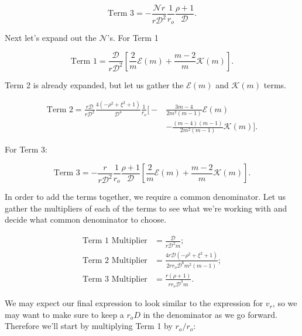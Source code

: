 \begin{equation}
        \text{Term 3} = -\frac{\mathcal{N}r}{r\mathcal{D}^2}\frac{1}{r_o}\frac{\rho+1}{\mathcal{D}}.
\end{equation}

Next let's expand out the \(\mathcal{N}\)'s.
%
For Term 1

\begin{equation}
    \text{Term 1} = \frac{\mathcal{D}}{r\mathcal{D}^2}\left[\frac{2}{m}\mathcal{E}(m) + \frac{m-2}{m}\mathcal{K}(m)\right].
\end{equation}

\noindent Term 2 is already expanded, but let us gather the \(\mathcal{E}(m)\) and \(\mathcal{K}(m)\) terms.

\begin{equation}
    \begin{split}
        \text{Term 2} = \frac{r\mathcal{D}}{r\mathcal{D}^2} \frac{4(-\rho^2+\xi^2 +1)}{\mathcal{D}^4}\frac{1}{r_o} \bigg[ -&\frac{3m-4}{2m^2(m-1)}\mathcal{E}(m) \\
                   &- \frac{(m-4)(m-1)}{2m^2(m-1)}\mathcal{K}(m) \bigg].
    \end{split}
\end{equation}

\noindent For Term 3:

\begin{equation}
        \text{Term 3} = -\frac{r}{r\mathcal{D}^2}\frac{1}{r_o}\frac{\rho+1}{\mathcal{D}}\left[\frac{2}{m}\mathcal{E}(m) + \frac{m-2}{m}\mathcal{K}(m)\right].
\end{equation}

In order to add the terms together, we require a common denominator.
%
Let us gather the multipliers of each of the terms to see what we're working with and decide what common denominator to choose.

\begin{align}
    \text{Term 1 Multiplier} &= \frac{\mathcal{D}}{r\mathcal{D}^2m}; \\
    \text{Term 2 Multiplier} &= \frac{4r\mathcal{D}(-\rho^2+\xi^2+1)}{2rr_o\mathcal{D}^6m^2(m-1)}; \\
    \text{Term 3 Multiplier} &= \frac{r(\rho+1)}{rr_o\mathcal{D}^3m}.
\end{align}

%
\noindent We may expect our final expression to look similar to the expression for \(v_r\), so we may want to make sure to keep a \(r_oD\) in the denominator as we go forward.
%
Therefore we'll start by multiplying Term 1 by \(r_o/r_o\):

